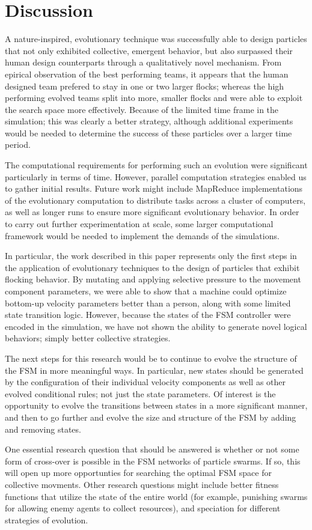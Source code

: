 \documentclass[12pt,journal,compsoc]{IEEEtran}
\begin{document}
\section{Discussion}
A nature-inspired, evolutionary technique was successfully able to design particles that not only exhibited collective, emergent behavior, but also surpassed their human design counterparts through a qualitatively novel mechanism. From epirical observation of the best performing teams, it appears that the human designed team prefered to stay in one or two larger flocks; whereas the high performing evolved teams split into more, smaller flocks and were able to exploit the search space more effectively. Because of the limited time frame in the simulation; this was clearly a better strategy, although additional experiments would be needed to determine the success of these particles over a larger time period.

The computational requirements for performing such an evolution were significant particularly in terms of time. However, parallel computation strategies enabled us to gather initial results. Future work might include MapReduce implementations of the evolutionary computation to distribute tasks across a cluster of computers, as well as longer runs to ensure more significant evolutionary behavior. In order to carry out further experimentation at scale, some larger computational framework would be needed to implement the demands of the simulations.

In particular, the work described in this paper represents only the first steps in the application of evolutionary techniques to the design of particles that exhibit flocking behavior. By mutating and applying selective pressure to the movement component parameters, we were able to show that a machine could optimize bottom-up velocity parameters better than a person, along with some limited state transition logic. However, because the states of the FSM controller were encoded in the simulation, we have not shown the ability to generate novel logical behaviors; simply better collective strategies.

The next steps for this research would be to continue to evolve the structure of the FSM in more meaningful ways. In particular, new states should be generated by the configuration of their individual velocity components as well as other evolved conditional rules; not just the state parameters. Of interest is the opportunity to evolve the transitions between states in a more significant manner, and then to go further and evolve the size and structure of the FSM by adding and removing states.

One essential research question that should be answered is whether or not some form of cross-over is possible in the FSM networks of particle swarms. If so, this will open up more opportunties for searching the optimal FSM space for collective movments. Other research questions might include better fitness functions that utilize the state of the entire world (for example, punishing swarms for allowing enemy agents to collect resources), and speciation for different strategies of evolution.



\end{document}

